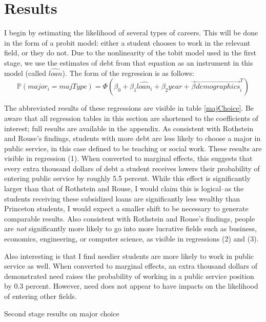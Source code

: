 \documentclass[12pt]{article}
\newcommand{\regs}{../Analysis/Regressions/Output/}
\begin{document}
	
	\section{Results}
	
	I begin by estimating the likelihood of several types of careers. This will be done in the form of a probit model: either a student chooses to work in the relevant field, or they do not. Due to the nonlinearity of the tobit model used in the first stage, we use the estimates of debt from that equation as an instrument in this model (called $\hat{loan}$). The form of the regression is as follows: 
	\begin{equation}
	\mathbb{P}\left(major_i = majType\right) = \Phi\left(\beta_0 + \beta_1 \hat{loan_i} + \beta_2 year + \vec{\beta}\vec{demographics}^T_i\right)
	\end{equation}
	
	The abbreviated results of these regressions are visible in table \ref{majChoice}. Be aware that all regression tables in this section are shortened to the coefficients of interest; full results are available in the appendix. As consistent with Rothstein and Rouse's findings, students with more debt are less likely to choose a major in public service, in this case defined to be teaching or social work. These results are visible in regression (1). When converted to marginal effects, this suggests that every extra thousand dollars of debt a student receives lowers their probability of entering public service by roughly 5.5 percent. While this effect is significantly larger than that of Rothstein and Rouse, I would claim this is logical--as the students receiving these subsidized loans are significantly less wealthy than Princeton students, I would expect a smaller shift to be necessary to generate comparable results. Also consistent with Rothstein and Rouse's findings, people are \emph{not} significantly more likely to go into more lucrative fields such as business, economics, engineering, or computer science, as visible in regressions (2) and (3). 
	
	Also interesting is that I find needier students are more likely to work in public service as well. When converted to marginal effects, an extra thousand dollars of demonstrated need raises the probability of working in a public service position by 0.3 percent. However, need does not appear to have impacts on the likelihood of entering other fields.

	\begin{table}
		\centering
		\caption{Second stage results on major choice}	
		\resizebox{\textwidth}{!}{	
			
		}
		\label{majChoice}
	\end{table}
	
\end{document}
